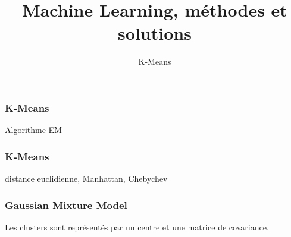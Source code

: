 \documentclass{formation}
\title{Machine Learning, méthodes et solutions}
\subtitle{K-Means}
\begin{document}
\maketitle

\begin{frame}
  \frametitle{K-Means}
  Algorithme EM
\end{frame}

\begin{frame}
  \frametitle{K-Means}
  distance euclidienne, Manhattan, Chebychev
\end{frame}

\begin{frame}
  \frametitle{Gaussian Mixture Model}
  Les clusters sont représentés par un centre et une matrice de covariance.
\end{frame}
\end{document}
